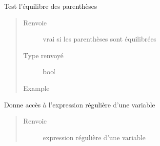 \documentclass[letterpaper,10pt,french]{sphinxmanual}
\begin{document}
\begin{fulllineitems}
\begin{fulllineitems}
\label{\detokenize{expressionparser:expressionparser.ExpressionParser.testBrackets}}
Test l’équilibre des parenthèses
\begin{quote}\begin{description}
\item[{Renvoie}] \leavevmode
vrai si les parenthèses sont équilibrées

\item[{Type renvoyé}] \leavevmode
bool

\item[{Example}] \leavevmode
\begin{sphinxVerbatim}[commandchars=\\\{\}]
\end{sphinxVerbatim}

\end{description}\end{quote}

\end{fulllineitems}


\begin{fulllineitems}
\label{\detokenize{expressionparser:expressionparser.ExpressionParser.variableRegex}}
Donne accès à l’expression régulière d’une variable
\begin{quote}\begin{description}
\item[{Renvoie}] \leavevmode
expression régulière d’une variable


\end{description}
\end{quote}
\end{fulllineitems}
\end{fulllineitems}
\end{document}
